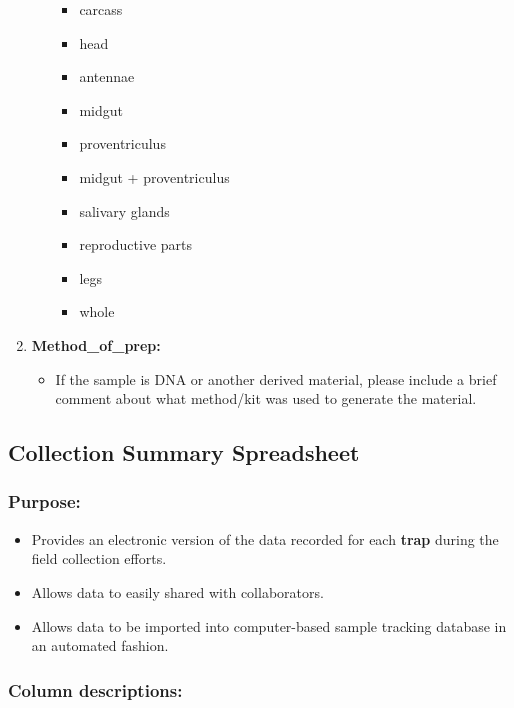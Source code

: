 \documentclass[letterpaper]{scrreprt}
\begin{document}
\begin{enumerate}
\begin{itemize}
    \begin{itemize}
    \itemsep1pt\parskip0pt
    \item
      carcass
    \item
      head
    \item
      antennae
    \item
      midgut
    \item
      proventriculus
    \item
      midgut + proventriculus
    \item
      salivary glands
    \item
      reproductive parts
    \item
      legs
    \item
      whole
    \end{itemize}
  \end{itemize}
\item
  \textbf{Method\_of\_prep:}

  \begin{itemize}
  \itemsep1pt\parskip0pt
  \item
    If the sample is DNA or another derived material, please include a
    brief comment about what method/kit was used to generate the
    material.
  \end{itemize}
\end{enumerate}

\subsection{Collection Summary
Spreadsheet}\label{collection-summary-spreadsheet}

\subsubsection{Purpose:}\label{purpose-1}

\begin{itemize}
\itemsep1pt\parskip0pt
\item
  Provides an electronic version of the data recorded for each
  \textbf{trap} during the field collection efforts.
\item
  Allows data to easily shared with collaborators.
\item
  Allows data to be imported into computer-based sample tracking
  database in an automated fashion.
\end{itemize}

\subsubsection{Column descriptions:}\label{column-descriptions-1}
\end{document}
